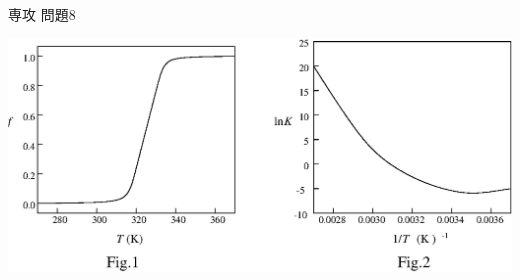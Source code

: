 \documentclass[fleqn]{jbook}
\begin{document}
\begin{question}{専攻 問題8}{}
\begin{subquestions}
\end{subquestions}

\begin{center}
  \mbox{\includegraphics[clip]{1995phy8-1.eps}}
\end{center}

\end{question}
\end{document}
